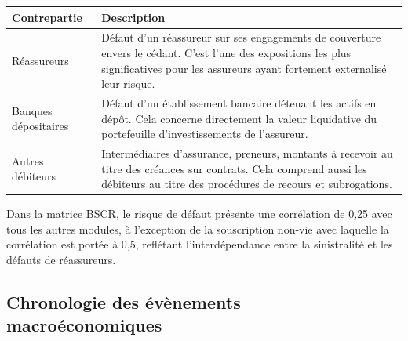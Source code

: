 \documentclass[
]{article}
\begin{document}
\begin{longtable}[]{@{}
  >{\raggedright\arraybackslash}p{}
  >{\raggedright\arraybackslash}p{}@{}}
\toprule\noalign{}
\begin{minipage}[b]{\linewidth}\raggedright
Contrepartie
\end{minipage} & \begin{minipage}[b]{\linewidth}\raggedright
Description
\end{minipage} \\
\midrule\noalign{}
\endhead
\bottomrule\noalign{}
\endlastfoot
Réassureurs & Défaut d'un réassureur sur ses engagements de couverture
envers le cédant. C'est l'une des expositions les plus significatives
pour les assureurs ayant fortement externalisé leur risque. \\
Banques dépositaires & Défaut d'un établissement bancaire détenant les
actifs en dépôt. Cela concerne directement la valeur liquidative du
portefeuille d'investissements de l'assureur. \\
Autres débiteurs & Intermédiaires d'assurance, preneurs, montants à
recevoir au titre des créances sur contrats. Cela comprend aussi les
débiteurs au titre des procédures de recours et subrogations. \\
\end{longtable}

Dans la matrice BSCR, le risque de défaut présente une corrélation de
0,25 avec tous les autres modules, à l'exception de la souscription
non-vie avec laquelle la corrélation est portée à 0,5, reflétant
l'interdépendance entre la sinistralité et les défauts de réassureurs.

\subsection{Chronologie des évènements
macroéconomiques}\label{chronologie-des-uxe9vuxe8nements-macrouxe9conomiques}
\end{document}
